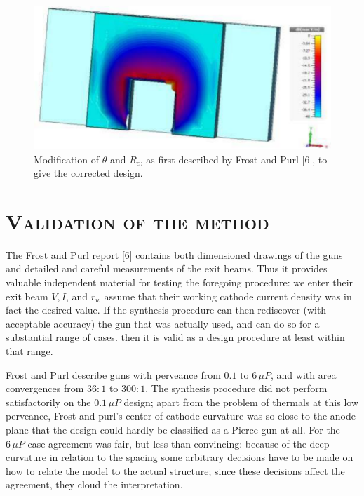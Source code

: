 \documentclass[10pt,a4paper,UTF8,fleqn]{article}
\begin{document}
\begin{figure}[htbp]
	\centering
	\includegraphics[width=0.8\linewidth]{figure/fig2}
	\caption{\small Modification of $ \theta $ and $ R_c $, as first described by Frost and Purl [6], to give the corrected design.}
	\label{fig2}
\end{figure}











\section{\textsc{Validation of the method}}


The Frost and Purl report [6] contains both dimensioned drawings of the guns and detailed and careful measurements of the exit beams. Thus it provides valuable independent material for testing the foregoing procedure: we enter their exit beam $ V, I $, and $ r_w $ assume that their working cathode current density was in fact the desired value. If the synthesis procedure can then rediscover (with acceptable accuracy) the gun that was actually used, and can do so for a substantial range of cases. then it is valid as a design procedure at least within that range.


Frost and Purl describe guns with perveance from $ 0.1 $ to $ 6\,\mu P$, and with area convergences from $ 36:1 $ to $ 300:1 $. The synthesis procedure did not perform satisfactorily on the $ 0.1\,\mu P $ design; apart from the problem of thermals at this low perveance, Frost and purl's center of cathode curvature was so close to the anode plane that the design could hardly be classified as a Pierce gun at all. For the $ 6\,\mu P $ case agreement was fair, but less than convincing: because of the deep curvature in relation to the spacing some arbitrary decisions have to be made on how to relate the model to the actual structure; since these decisions affect the agreement, they cloud the interpretation.
\end{document}
